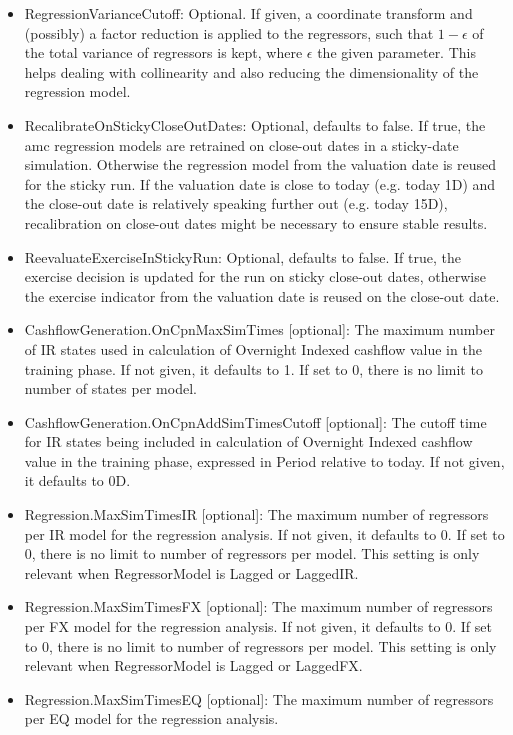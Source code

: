 \begin{itemize}
\begin{itemize}
  \end{itemize}
\item RegressionVarianceCutoff: Optional. If given, a coordinate transform and (possibly) a factor reduction is
  applied to the regressors, such that $1-\epsilon$ of the total variance of regressors is kept, where $\epsilon$ the
  given parameter. This helps dealing with collinearity and also reducing the dimensionality of the regression model.
\item RecalibrateOnStickyCloseOutDates: Optional, defaults to false. If true, the amc regression models are
  retrained on close-out dates in a sticky-date simulation. Otherwise the regression model from the valuation date is
  reused for the sticky run. If the valuation date is close to today (e.g. today  1D) and the close-out date is
  relatively speaking further out (e.g. today  15D), recalibration on close-out dates might be necessary to ensure
  stable results.
\item ReevaluateExerciseInStickyRun: Optional, defaults to false. If true, the exercise decision is updated for
  the run on sticky close-out dates, otherwise the exercise indicator from the valuation date is reused on the close-out
  date.
\item CashflowGeneration.OnCpnMaxSimTimes [optional]: The maximum number of IR states used in calculation of
  Overnight Indexed cashflow value in the training phase. If not given, it defaults to 1. If set to 0, there is no limit
  to number of states per model.
\item CashflowGeneration.OnCpnAddSimTimesCutoff [optional]: The cutoff time for IR states being included in
  calculation of Overnight Indexed cashflow value in the training phase, expressed in Period relative to today.
  If not given, it defaults to 0D.
\item Regression.MaxSimTimesIR [optional]: The maximum number of regressors per IR model for the regression analysis.
  If not given, it defaults to 0. If set to 0, there is no limit to number of regressors per model. This setting is only
  relevant when RegressorModel is Lagged or LaggedIR.
\item Regression.MaxSimTimesFX [optional]: The maximum number of regressors per FX model for the regression analysis.
  If not given, it defaults to 0. If set to 0, there is no limit to number of regressors per model. This setting is only
  relevant when RegressorModel is Lagged or LaggedFX.
\item Regression.MaxSimTimesEQ [optional]: The maximum number of regressors per EQ model for the regression analysis.

\end{itemize}
